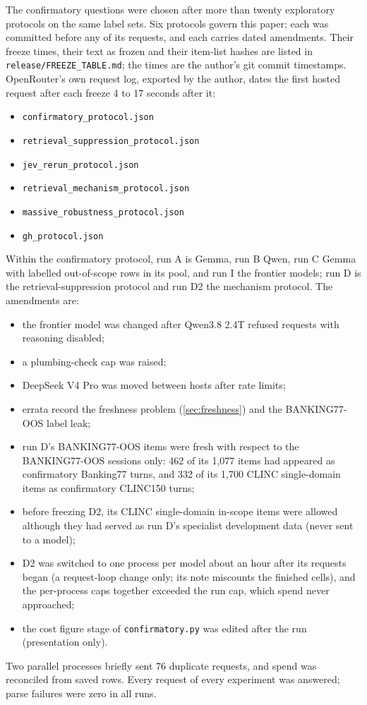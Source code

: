 \documentclass[11pt]{article}
\begin{document}
The confirmatory questions were chosen after more than twenty exploratory protocols on the same label sets. Six protocols govern this paper; each was committed before any of its requests, and each carries dated amendments. Their freeze times, their text as frozen and their item-list hashes are listed in \texttt{release/FREEZE\_TABLE.md}; the times are the author's git commit timestamps. OpenRouter's own request log, exported by the author, dates the first hosted request after each freeze 4 to 17 seconds after it:
\begin{itemize}
  \item \texttt{confirmatory\_protocol.json}
  \item \texttt{retrieval\_suppression\_protocol.json}
  \item \texttt{jev\_rerun\_protocol.json}
  \item \texttt{retrieval\_mechanism\_protocol.json}
  \item \texttt{massive\_robustness\_protocol.json}
  \item \texttt{gh\_protocol.json}
\end{itemize}
Within the confirmatory protocol, run A is Gemma, run B Qwen, run C Gemma with labelled out-of-scope rows in its pool, and run I the frontier models; run D is the retrieval-suppression protocol and run D2 the mechanism protocol. The amendments are:
\begin{itemize}
  \item the frontier model was changed after Qwen3.8 2.4T refused requests with reasoning disabled;
  \item a plumbing-check cap was raised;
  \item DeepSeek V4 Pro was moved between hosts after rate limits;
  \item errata record the freshness problem (\cref{sec:freshness}) and the BANKING77-OOS label leak;
  \item run D's BANKING77-OOS items were fresh with respect to the BANKING77-OOS sessions only: 462 of its 1,077 items had appeared as confirmatory Banking77 turns, and 332 of its 1,700 CLINC single-domain items as confirmatory CLINC150 turns;
  \item before freezing D2, its CLINC single-domain in-scope items were allowed although they had served as run D's specialist development data (never sent to a model);
  \item D2 was switched to one process per model about an hour after its requests began (a request-loop change only; its note miscounts the finished cells), and the per-process caps together exceeded the run cap, which spend never approached;
  \item the cost figure stage of \texttt{confirmatory.py} was edited after the run (presentation only).
\end{itemize}
Two parallel processes briefly sent 76 duplicate requests, and spend was reconciled from saved rows. Every request of every experiment was answered; parse failures were zero in all runs.
\end{document}

